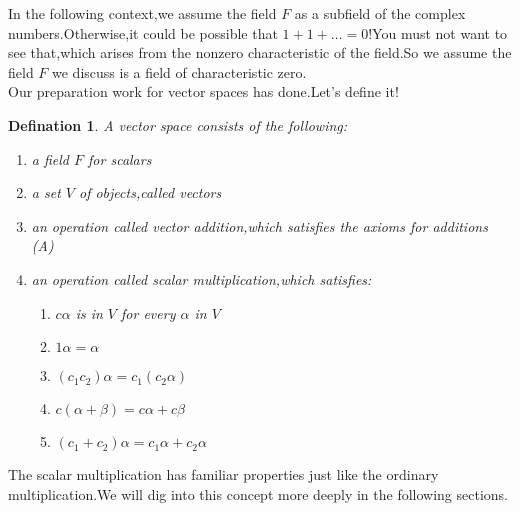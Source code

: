 \documentclass{article}
\begin{document}
\indent In the following context,we assume the field $F$ as a subfield of the complex numbers.Otherwise,it could be possible that $1+1+\dots =0$!You must not want to see that,which arises from the nonzero characteristic of the field.So we assume the field $F$ we discuss is a field of characteristic zero.\\
\indent Our preparation work for vector spaces has done.Let's define it!
\theoremstyle{defination}\newtheorem{dde}{Defination}[section]
\begin{dde}
	A vector space consists of the following:
	\begin{enumerate}
		\item a field $F$ for scalars
		\item a set $V$ of objects,called vectors
		\item an operation called vector addition,which satisfies the axioms for additions (A)
		\item an operation called scalar multiplication,which satisfies:
		\begin{enumerate}
			\item[(a)] $c\alpha$ is in $V$ for every $\alpha$ in $V$
			\item[(b)] $1\alpha=\alpha$
			\item[(c)] $(c_1c_2)\alpha=c_1(c_2\alpha)$
			\item[(d)] $c(\alpha+\beta)=c\alpha+c\beta$
			\item[(e)] $(c_1+c_2)\alpha=c_1\alpha+c_2\alpha$
		\end{enumerate}
	\end{enumerate}
\end{dde}
The scalar multiplication has familiar properties just like the ordinary multiplication.We will dig into this concept more deeply in the following sections.
\end{document}
